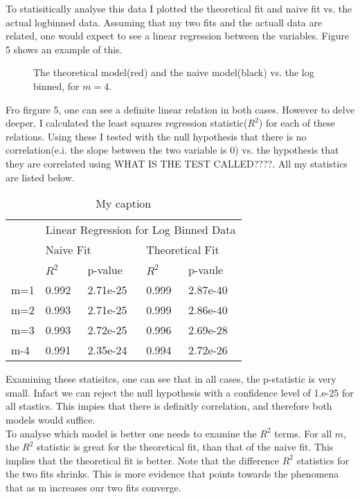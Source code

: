 \documentclass[]{article}
\begin{document}
To statisitically analyse this data I plotted the theoretical fit and naive fit vs. the actual logbinned data. Assuming that my two fits and the actuall data are related, one would expect to see a linear regression between the variables. Figure 5 shows an example of this.
\begin{figure}[H]
	 	   		\caption{The theoretical model(red) and the naive model(black) vs. the log binned, for $m=4$.
	 	   			}
\end{figure}
Fro firgure 5, one can see a definite linear relation in both cases. However to delve deeper, I calculated the least squares regression statistic($R^2$) for each of these relations. Using these I tested with the null hypothesis that there is no correlation(e.i. the slope between the two variable is 0) vs. the hypothesis that they are correlated using WHAT IS THE TEST CALLED????. All my statistics are listed below.
\begin{table}[H]
	\centering
	\caption{My caption}
	\label{my-label}
	\begin{tabular}{l|l|l|l|l|}
		\cline{2-5}
		& \multicolumn{4}{l|}{Linear Regression for Log Binned Data}            \\ \cline{2-5} 
		& \multicolumn{2}{l|}{Naive Fit} & \multicolumn{2}{l|}{Theoretical Fit} \\ \cline{2-5} 
		& $R^2$        & p-value         & $R^2$            & p-vaule           \\ \hline
		\multicolumn{1}{|l|}{m=1} & 0.992        & 2.71e-25        & 0.999            & 2.87e-40          \\ \hline
		\multicolumn{1}{|l|}{m=2} & 0.993        & 2.71e-25        & 0.999            & 2.86e-40          \\ \hline
		\multicolumn{1}{|l|}{m=3} & 0.993        & 2.72e-25        & 0.996            & 2.69e-28          \\ \hline
		\multicolumn{1}{|l|}{m-4} & 0.991        & 2.35e-24        & 0.994            & 2.72e-26          \\ \hline
	\end{tabular}
\end{table}
Examining these statisitcs, one can see that in all cases, the p-statistic is very small. Infact we can reject the null hypothesis with a confidence level of 1.e-25 for all stastics. This impies that there is definitly correlation, and therefore both models would suffice.\\
To analyse which model is better one needs to examine the $R^2$ terms. For all $m$, the $R^2$ statistic is great for the theoretical fit, than that of the naive fit. This implies that the theoretical fit is better.
Note that the difference $R^2$ statistics for the two fits shrinks. This is more evidence that points towards the phenomena that as m increases our two fits converge.    
\end{document}
